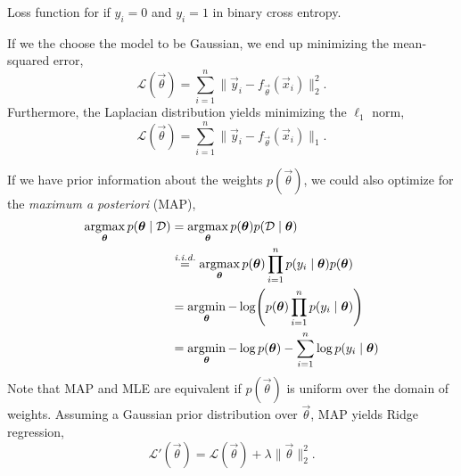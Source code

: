 \begin{marginfigure}[5cm]
    \centering
    \caption{Loss function for if $y_i = 0$ and $y_i = 1$ in binary cross entropy.}
    \label{fig:bce-loss}
\end{marginfigure}

If we the choose the model to be Gaussian, we end up minimizing the mean-squared error, \[
    \mathcal{L}(\vec{\theta}) = \sum_{i=1}^{n} \| \vec{y}_i - f_{\vec{\theta}}(\vec{x}_i) \|_2^2.
\]
Furthermore, the Laplacian distribution yields minimizing the $\ell_1$ norm, \[
    \mathcal{L}(\vec{\theta}) = \sum_{i=1}^{n} \| \vec{y}_i - f_{\vec{\theta}}(\vec{x}_i) \|_1.
\]

If we have prior information about the weights $p(\vec{\theta})$, we could also optimize for the
\textit{maximum a posteriori} (MAP),
\begin{align*}
    \argmax_{\vec{\theta}} p(\vec{\theta}\mid \mathcal{D}) & = \argmax_{\vec{\theta}} p(\vec{\theta}) p(\mathcal{D}\mid\vec{\theta})                                              \\
                                                           & \overset{\text{\iid}}{=} \argmax_{\vec{\theta}} p(\vec{\theta}) \prod_{i=1}^n p(y_i\mid\vec{\theta}) p(\vec{\theta}) \\
                                                           & = \argmin_{\vec{\theta}} -\log \lft( p(\vec{\theta}) \prod_{i=1}^n p(y_i\mid\vec{\theta}) \rgt)                      \\
                                                           & = \argmin_{\vec{\theta}} - \log p(\vec{\theta}) - \sum_{i=1}^{n} \log p(y_i\mid \vec{\theta})                        \\
\end{align*}
Note that MAP and MLE are equivalent if $p(\vec{\theta})$ is uniform over the domain of weights.
Assuming a Gaussian prior distribution over $\vec{\theta}$, MAP yields Ridge regression, \[
    \mathcal{L}'(\vec{\theta}) = \mathcal{L}(\vec{\theta}) + \lambda \| \vec{\theta} \|_2^2.
\]


